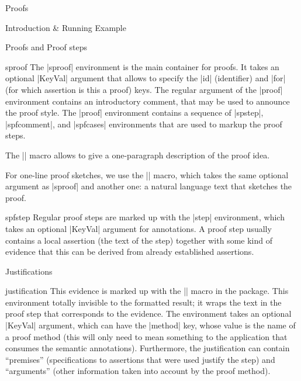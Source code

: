 \begin{sfragment}{Proofs}
\begin{sfragment}{Introduction \& Running Example}
\end{sfragment}

\begin{sfragment}{Proofs and Proof steps}

  \begin{environment}{sproof}
    The |sproof| environment is the main container for proofs. It takes an optional
    |KeyVal| argument that allows to specify the |id| (identifier) and |for| (for which
    assertion is this a proof) keys. The regular argument of the |proof| environment
    contains an introductory comment, that may be used to announce the proof style. The
    |proof| environment contains a sequence of |spstep|, |spfcomment|, and |spfcases|
    environments that are used to markup the proof steps.
  \end{environment}
  
  \begin{function}{\spfidea}
    The |\spfidea| macro allows to give a one-paragraph description of the proof idea.
  \end{function}
  
  \begin{function}{\spfsketch}
    For one-line proof sketches, we use the |\spfsketch| macro, which takes the same
    optional argument as |sproof| and another one: a natural language text that sketches
    the proof.
  \end{function}
  
  \begin{environment}{spfstep}
    Regular proof steps are marked up with the |step| environment, which takes an optional
    |KeyVal| argument for annotations. A proof step usually contains a local assertion
    (the text of the step) together with some kind of evidence that this can be derived
    from already established assertions.
  \end{environment}
  
\end{sfragment}

\begin{sfragment}{Justifications}

  \begin{environment}{justification}
    This evidence is marked up with the |\spfjust| macro in the 
    package. This environment totally invisible to the formatted result; it wraps the text
    in the proof step that corresponds to the evidence. The environment takes an optional
    |KeyVal| argument, which can have the |method| key, whose value is the name of a proof
    method (this will only need to mean something to the application that consumes the
    semantic annotations). Furthermore, the justification can contain ``premises''
    (specifications to assertions that were used justify the step) and ``arguments''
    (other information taken into account by the proof method).
  \end{environment}
  

\end{sfragment}
\end{sfragment}
